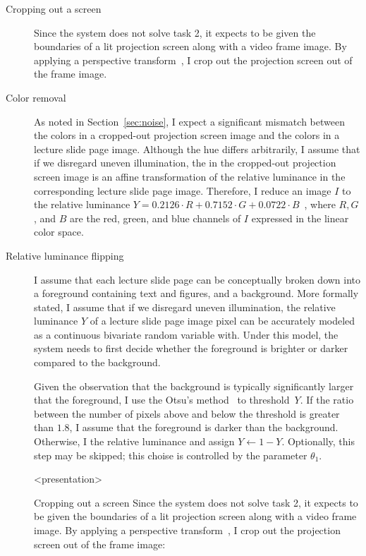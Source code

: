 \begin{description}
  \item[Cropping out a screen]
    Since the system does not solve task 2, it expects to be given the
    boundaries of a lit projection screen along with a video frame image. By
    applying a perspective transform~\cite[sec.~2]{eberly11}, I crop out the
    projection screen out of the frame image.
  \item[Color removal]
    As noted in Section~\ref{sec:noise}, I expect a significant mismatch
    between the colors in a cropped-out projection screen image and the colors
    in a lecture slide page image. Although the hue differs arbitrarily, I
    assume that if we disregard uneven illumination, the  in the cropped-out projection screen image is an affine
    transformation of the relative luminance in the corresponding lecture slide
    page image. Therefore, I reduce an image $I$ to the relative luminance
    $Y=0.2126\cdot R+0.7152\cdot G+0.0722\cdot B$~\cite[part~2]{stokesetal96},
    where $R,G$, and $B$ are the red, green, and blue channels of $I$ expressed
    in the linear  color space.
  \item[Relative luminance flipping]
    I assume that each lecture slide page can be conceptually broken down into
    a foreground containing text and figures, and a background.
    More formally stated, I assume that if we disregard uneven illumination,
    the relative luminance $Y$ of a lecture slide page image pixel can be
    accurately modeled as a continuous bivariate random variable with. Under
    this model, the system needs to first decide whether the foreground is
    brighter or darker compared to the background.
    
    Given the observation that the background is typically significantly
    larger that the foreground, I use the Otsu's
    method~\cite{otsu1979threshold} to threshold~$Y$. If the ratio between the
    number of pixels above and below the threshold is greater than $1.8$, I
    assume that the foreground is darker than the background. Otherwise, I
     the relative luminance and assign $Y\leftarrow1-Y$.
    Optionally, this step may be skipped; this choise is controlled by the
    parameter $\theta_1$.

\mode
<presentation>

  \begin{frame}{Cropping out a screen}
    Since the system does not solve task 2, it expects to be given the
    boundaries of a lit projection screen along with a video frame image. By
    applying a perspective transform~\cite[sec.~2]{eberly11}, I crop out the
    projection screen out of the frame image:


\end{frame}
\end{description}
